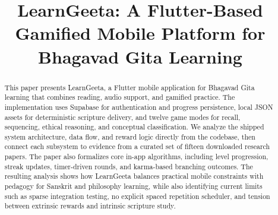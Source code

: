 \documentclass[conference]{IEEEtran}
\begin{document}
\title{LearnGeeta: A Flutter-Based Gamified Mobile Platform for Bhagavad Gita Learning}

\author{
\and
{}
\and
{}
\and
{}
\and
{}
}

\maketitle

\begin{abstract}
This paper presents LearnGeeta, a Flutter mobile application for Bhagavad Gita learning that combines reading, audio support, and gamified practice. The implementation uses Supabase for authentication and progress persistence, local JSON assets for deterministic scripture delivery, and twelve game modes for recall, sequencing, ethical reasoning, and conceptual classification. We analyze the shipped system architecture, data flow, and reward logic directly from the codebase, then connect each subsystem to evidence from a curated set of fifteen downloaded research papers. The paper also formalizes core in-app algorithms, including level progression, streak updates, timer-driven rounds, and karma-based branching outcomes. The resulting analysis shows how LearnGeeta balances practical mobile constraints with pedagogy for Sanskrit and philosophy learning, while also identifying current limits such as sparse integration testing, no explicit spaced repetition scheduler, and tension between extrinsic rewards and intrinsic scripture study.
\end{abstract}
\end{document}
